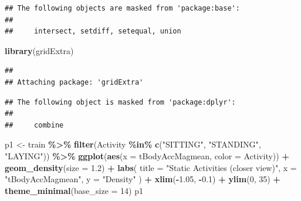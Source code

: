 \documentclass[
]{article}
\newenvironment{Shaded}{\begin{snugshade}}{\end{snugshade}}
\newcommand{\AttributeTok}[1]{\textcolor[rgb]{0.13,0.29,0.53}{#1}}
\newcommand{\DecValTok}[1]{\textcolor[rgb]{0.00,0.00,0.81}{#1}}
\newcommand{\FloatTok}[1]{\textcolor[rgb]{0.00,0.00,0.81}{#1}}
\newcommand{\FunctionTok}[1]{\textcolor[rgb]{0.13,0.29,0.53}{\textbf{#1}}}
\newcommand{\NormalTok}[1]{#1}
\newcommand{\OtherTok}[1]{\textcolor[rgb]{0.56,0.35,0.01}{#1}}
\newcommand{\SpecialCharTok}[1]{\textcolor[rgb]{0.81,0.36,0.00}{\textbf{#1}}}
\newcommand{\StringTok}[1]{\textcolor[rgb]{0.31,0.60,0.02}{#1}}
\begin{document}
\begin{verbatim}
## The following objects are masked from 'package:base':
## 
##     intersect, setdiff, setequal, union
\end{verbatim}

\begin{Shaded}
\begin{Highlighting}[]
\FunctionTok{library}\NormalTok{(gridExtra)}
\end{Highlighting}
\end{Shaded}

\begin{verbatim}
## 
## Attaching package: 'gridExtra'
\end{verbatim}

\begin{verbatim}
## The following object is masked from 'package:dplyr':
## 
##     combine
\end{verbatim}

\begin{Shaded}
\begin{Highlighting}[]
\NormalTok{p1 }\OtherTok{\textless{}{-}}\NormalTok{ train }\SpecialCharTok{\%\textgreater{}\%}
  \FunctionTok{filter}\NormalTok{(Activity }\SpecialCharTok{\%in\%} \FunctionTok{c}\NormalTok{(}\StringTok{"SITTING"}\NormalTok{, }\StringTok{"STANDING"}\NormalTok{, }\StringTok{"LAYING"}\NormalTok{)) }\SpecialCharTok{\%\textgreater{}\%}
  \FunctionTok{ggplot}\NormalTok{(}\FunctionTok{aes}\NormalTok{(}\AttributeTok{x =}\NormalTok{ tBodyAccMagmean, }\AttributeTok{color =}\NormalTok{ Activity)) }\SpecialCharTok{+}
  \FunctionTok{geom\_density}\NormalTok{(}\AttributeTok{size =} \FloatTok{1.2}\NormalTok{) }\SpecialCharTok{+}
  \FunctionTok{labs}\NormalTok{(}
    \AttributeTok{title =} \StringTok{"Static Activities (closer view)"}\NormalTok{,}
    \AttributeTok{x =} \StringTok{"tBodyAccMagmean"}\NormalTok{,}
    \AttributeTok{y =} \StringTok{"Density"}
\NormalTok{  ) }\SpecialCharTok{+}
  \FunctionTok{xlim}\NormalTok{(}\SpecialCharTok{{-}}\FloatTok{1.05}\NormalTok{, }\SpecialCharTok{{-}}\FloatTok{0.1}\NormalTok{) }\SpecialCharTok{+}
  \FunctionTok{ylim}\NormalTok{(}\DecValTok{0}\NormalTok{, }\DecValTok{35}\NormalTok{) }\SpecialCharTok{+}
  \FunctionTok{theme\_minimal}\NormalTok{(}\AttributeTok{base\_size =} \DecValTok{14}\NormalTok{)}
\NormalTok{p1}
\end{Highlighting}
\end{Shaded}
\end{document}
